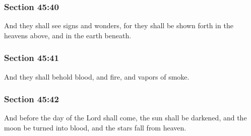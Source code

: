 	\subsubsection{Section 45:40} %
		\label{DC45-40}

		And they shall see signs and wonders, for they shall be shown forth in the heavens above, and in the earth beneath.


	\subsubsection{Section 45:41} %
		\label{DC45-41}

		And they shall behold blood, and fire, and vapors of smoke.


	\subsubsection{Section 45:42} %
		\label{DC45-42}

		And before the day of the Lord shall come, the sun shall be darkened, and the moon be turned into blood, and the stars fall from heaven.


